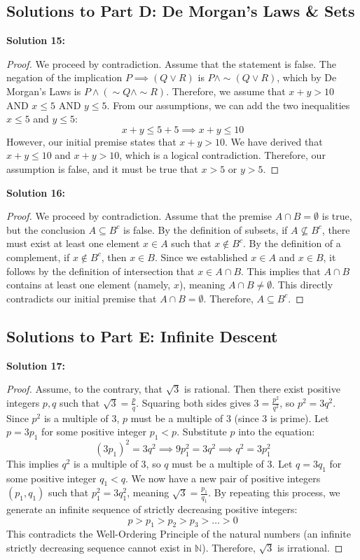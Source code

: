 \documentclass[11pt]{article}
\theoremstyle{definition}
\begin{document}
\subsection*{Solutions to Part D: De Morgan's Laws \& Sets}

\textbf{Solution 15:}
\begin{proof}
We proceed by contradiction. Assume that the statement is false. The negation of the implication $P \implies (Q \lor R)$ is $P \land \sim(Q \lor R)$, which by De Morgan's Laws is $P \land (\sim Q \land \sim R)$. Therefore, we assume that $x + y > 10$ AND $x \le 5$ AND $y \le 5$. 
From our assumptions, we can add the two inequalities $x \le 5$ and $y \le 5$:
\[ x + y \le 5 + 5 \implies x + y \le 10 \]
However, our initial premise states that $x + y > 10$. We have derived that $x + y \le 10$ and $x + y > 10$, which is a logical contradiction. Therefore, our assumption is false, and it must be true that $x > 5$ or $y > 5$.
\end{proof}

\textbf{Solution 16:}
\begin{proof}
We proceed by contradiction. Assume that the premise $A \cap B = \emptyset$ is true, but the conclusion $A \subseteq B^c$ is false. By the definition of subsets, if $A \not\subseteq B^c$, there must exist at least one element $x \in A$ such that $x \notin B^c$. 
By the definition of a complement, if $x \notin B^c$, then $x \in B$. 
Since we established $x \in A$ and $x \in B$, it follows by the definition of intersection that $x \in A \cap B$. 
This implies that $A \cap B$ contains at least one element (namely, $x$), meaning $A \cap B \neq \emptyset$. This directly contradicts our initial premise that $A \cap B = \emptyset$. Therefore, $A \subseteq B^c$.
\end{proof}

\subsection*{Solutions to Part E: Infinite Descent}

\textbf{Solution 17:}
\begin{proof}
Assume, to the contrary, that $\sqrt{3}$ is rational. Then there exist positive integers $p, q$ such that $\sqrt{3} = \frac{p}{q}$. Squaring both sides gives $3 = \frac{p^2}{q^2}$, so $p^2 = 3q^2$. Since $p^2$ is a multiple of $3$, $p$ must be a multiple of $3$ (since $3$ is prime). Let $p = 3p_1$ for some positive integer $p_1 < p$. Substitute $p$ into the equation:
\[ (3p_1)^2 = 3q^2 \implies 9p_1^2 = 3q^2 \implies q^2 = 3p_1^2 \]
This implies $q^2$ is a multiple of $3$, so $q$ must be a multiple of $3$. Let $q = 3q_1$ for some positive integer $q_1 < q$. We now have a new pair of positive integers $(p_1, q_1)$ such that $p_1^2 = 3q_1^2$, meaning $\sqrt{3} = \frac{p_1}{q_1}$. By repeating this process, we generate an infinite sequence of strictly decreasing positive integers:
\[ p > p_1 > p_2 > p_3 > \dots > 0 \]
This contradicts the Well-Ordering Principle of the natural numbers (an infinite strictly decreasing sequence cannot exist in $\mathbb{N}$). Therefore, $\sqrt{3}$ is irrational.
\end{proof}
\end{document}
